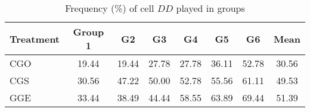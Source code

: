 \documentclass[12pt, letterpaper]{article}
\theoremstyle{plain}
\begin{document}
\begin{table}[!t]
\centering
\caption{Frequency (\%) of cell $DD$ played in groups }
\begin{tabular}{lccccccc}
\hline
Treatment & Group 1 & G2  & G3 & G4 & G5 & G6 & Mean\\
  \hline
  CGO &  19.44 & 19.44&  27.78 & 27.78 & 36.11 & 52.78 & 30.56 \\
  CGS & 30.56 & 47.22&  50.00 & 52.78 & 55.56 & 61.11 & 49.53\\
  GGE & 33.44 & 38.49 & 44.44 & 58.55 & 63.89 & 69.44 & 51.39 \\
  \hline

\end{tabular}

\label{table:dd}
\end{table}
\end{document}
